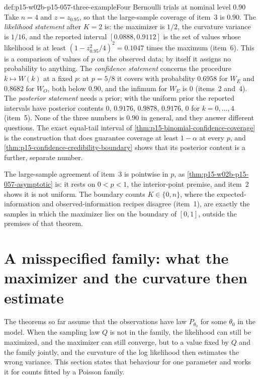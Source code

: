 \begin{hbexample}{def:p15-w02b-p15-057-three-example}{Four Bernoulli trials at nominal level 0.90}
Take \(n=4\) and \(z=z_{0.95}\), so that the large-sample coverage of
item~3 is \(0.90\). The \emph{likelihood statement} after \(K=2\) is: the
maximizer is \(1/2\), the curvature variance is \(1/16\), and the reported
interval \([0.0888,0.9112]\) is the set of values whose likelihood is at
least \((1-z_{0.95}^2/4)^2=0.1047\) times the maximum (item~6). This is a
comparison of values of \(p\) on the observed data; by itself it assigns
no probability to anything. The \emph{confidence statement} concerns the
procedure \(k\mapsto W(k)\) at a fixed \(p\): at \(p=5/8\) it covers with
probability \(0.6958\) for \(W_E\) and \(0.8682\) for \(W_O\), both below
\(0.90\), and the infimum for \(W_E\) is \(0\) (items~2 and~4). The
\emph{posterior statement} needs a prior; with the uniform prior the
reported intervals have posterior contents \(0\), \(0.9176\), \(0.9878\),
\(0.9176\), \(0\) for \(k=0,\ldots,4\) (item~5). None of the three numbers
is \(0.90\) in general, and they answer different questions. The exact
equal-tail interval of \cref{thm:p15-binomial-confidence-coverage} is the
construction that does guarantee coverage at least \(1-\alpha\) at every
\(p\), and \cref{thm:p15-confidence-credibility-boundary} shows that its
posterior content is a further, separate number.
\end{hbexample}

The large-sample agreement of item~3 is pointwise in \(p\), as
\cref{thm:p15-w02b-p15-057-asymptotic} is: it rests on \(0<p<1\), the
interior-point premise, and item~2 shows it is not uniform. The boundary
counts \(K\in\{0,n\}\), where the expected-information and
observed-information recipes disagree (item~1), are exactly the samples in
which the maximizer lies on the boundary of \([0,1]\), outside the
premises of that theorem.

\section{A misspecified family: what the maximizer and the curvature then estimate}
\label{sec:p15-w02b-p15-057-misspecified}

The theorems so far assume that the observations have law \(P_{\theta_0}\)
for some \(\theta_0\) in the model. When the sampling law \(Q\) is not in
the family, the likelihood can still be maximized, and the maximizer can
still converge, but to a value fixed by \(Q\) and the family jointly, and
the curvature of the log likelihood then estimates the wrong variance.
This section states that behaviour for one parameter and works it for
counts fitted by a Poisson family.

